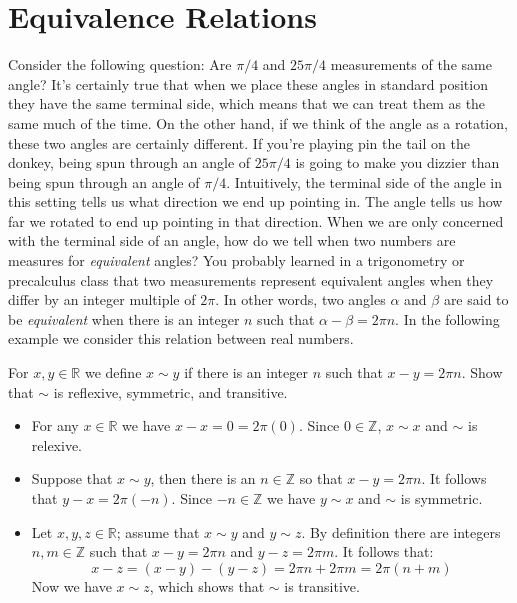 \section{Equivalence Relations}

Consider the following question: Are $\pi/4$ and $25\pi/4$ measurements of the same angle? It's certainly true that when we place these angles in standard position they have the same terminal side, which means that we can treat them as the same much of the time. On the other hand, if we think of the angle as a rotation, these two angles are certainly different. If you're playing pin the tail on the donkey, being spun through an angle of $25\pi/4$ is going to make you dizzier than being spun through an angle of $\pi/4$. Intuitively, the terminal side of the angle in this setting tells us what direction we end up pointing in. The angle tells us how far we rotated to end up pointing in that direction. When we are only concerned with the terminal side of an angle, how do we tell when two numbers are measures for \emph{equivalent} angles? You probably learned in a trigonometry or precalculus class that two measurements represent equivalent angles when they differ by an integer multiple of $2\pi$. In other words, two angles $\alpha$ and $\beta$ are said to be \emph{equivalent} when there is an integer $n$ such that $\alpha-\beta=2\pi n$. In the following example we consider this relation between real numbers.

\begin{example}
For $x,y\in\mathbb R$ we define $x\sim y$ if there is an integer $n$ such that $x-y=2\pi n$. Show that $\sim$ is reflexive, symmetric, and transitive.
\begin{itemize}
\item For any $x\in\mathbb R$ we have $x-x=0=2\pi (0)$. Since $0\in\mathbb Z$, $x\sim x$ and $\sim$ is relexive.
\item Suppose that $x\sim y$, then there is an $n\in\mathbb Z$ so that $x-y=2\pi n$. It follows that $y-x=2\pi(-n)$. Since $-n\in\mathbb Z$ we have $y\sim x$ and $\sim$ is symmetric.
\item Let $x,y,z\in\mathbb R$; assume that $x\sim y$ and $y\sim z$. By definition there are integers $n,m\in\mathbb Z$ such that $x-y=2\pi n$ and $y-z=2\pi m$. It follows that: \[x-z=(x-y)-(y-z)=2\pi n+2\pi m=2\pi(n+m)\] Now we have $x\sim z$, which shows that $\sim$ is transitive.
\end{itemize}
\end{example}

